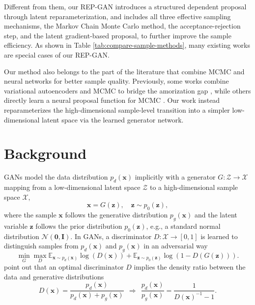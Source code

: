\documentclass[runningheads]{llncs}
\newcommand{\bx}{\mathbf{x}}
\newcommand{\bz}{\mathbf{z}}
\newcommand{\bI}{\mathbf{I}}
\newcommand{\cN}{\mathcal{N}}
\newcommand{\cX}{\mathcal{X}}
\newcommand{\cZ}{\mathcal{Z}}
\newcommand{\bbE}{\mathbb{E}}
\newcommand{\bzero}{\mathbf{0}}
\newcommand{\<}{\left\langle}
\renewcommand{\>}{\right\rangle}
\begin{document}
Different from them, our REP-GAN introduces a structured dependent proposal through latent reparameterization, and includes all three effective sampling mechanisms, the Markov Chain Monte Carlo method, the acceptance-rejection step, and the latent gradient-based proposal, to further improve the sample efficiency. As shown in Table \ref{tab:compare-sample-methods}, many existing works are special cases of our REP-GAN. 

Our method also belongs to the part of the literature that combine MCMC and neural networks for better sample quality. Previously, some works combine variational autoencoders \cite{kingma2013auto} and MCMC to bridge the amorization gap \cite{salimans2015markov,hoffman2017learning,li2017approximate}, while others directly learn a neural proposal function for MCMC \cite{song2017nice,levy2017generalizing,wang2018meta}. Our work instead reparameterizes the high-dimensional sample-level transition into a simpler low-dimensional latent space via the learned generator network. 

\section{Background}
GANs model the data distribution $p_d(\bx)$ implicitly with a generator $G: \cZ\to\cX$ mapping from a low-dimensional latent space $\cZ$ to a high-dimensional sample space $\cX$,
\begin{equation}
    \bx=G(\bz), \quad \bz\sim p_0(\bz),
\end{equation}
where the sample $\bx$ follows the generative distribution $p_g(\bx)$ and the latent variable $\bz$ follows the prior distribution $p_0(\bz)$, e.g., a standard normal distribution $\cN(\bzero,\bI)$. In GANs, a discriminator  $D:\cX\to[0,1]$ is learned to distinguish samples from $p_d(\bx)$ and $p_g(\bx)$ in an adversarial way
\begin{equation}
    \min_G\max_D\bbE_{\bx\sim p_d(\bx)}\log(D(\bx))+\bbE_{\bz\sim p_0(\bz)}\log(1-D(G(\bz))).
\end{equation}
\cite{goodfellow2014generative} point out that an optimal discriminator $D$ implies the density ratio between the data and generative distributions 
\begin{equation}
D(\mathbf{x})=\frac{p_{d}(\mathbf{x})}{p_{d}(\mathbf{x})+p_{g}(\mathbf{x})} ~~\Rightarrow ~~ \frac{p_d(\bx)}{p_g(\bx)}=\frac{1}{D(\bx)^{-1}-1}.
\label{eq:optimal-D}
\end{equation}
\end{document}
